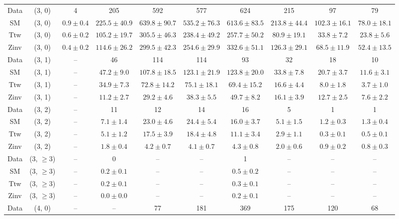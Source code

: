 \begin{table}[h!]
{\begin{tabular}{cccccccccc}
	Data & (3, 0) & 4 & 205 & 592 & 577 & 624 & 215 & 97 & 79 \\[0.5ex] 
	SM & (3, 0) & $0.9\pm 0.4$ & $225.5\pm 40.9$ & $639.8\pm 90.7$ & $535.2\pm 76.3$ & $613.6\pm 83.5$ & $213.8\pm 44.4$ & $102.3\pm 16.1$ & $78.0\pm 18.1$ \\[0.5ex] 
	Ttw & (3, 0) & $0.6\pm 0.2$ & $105.2\pm 19.7$ & $305.5\pm 46.3$ & $238.4\pm 49.2$ & $257.7\pm 50.2$ & $80.9\pm 19.1$ & $33.8\pm 7.2$ & $23.8\pm 5.6$ \\[0.5ex] 
	Zinv & (3, 0) & $0.4\pm 0.2$ & $114.6\pm 26.2$ & $299.5\pm 42.3$ & $254.6\pm 29.9$ & $332.6\pm 51.1$ & $126.3\pm 29.1$ & $68.5\pm 11.9$ & $52.4\pm 13.5$ \\[0.5ex] 
	Data & (3, 1) & -- & 46 & 114 & 114 & 93 & 32 & 18 & 10 \\[0.5ex] 
	SM & (3, 1) & -- & $47.2\pm 9.0$ & $107.8\pm 18.5$ & $123.1\pm 21.9$ & $123.8\pm 20.0$ & $33.8\pm 7.8$ & $20.7\pm 3.7$ & $11.6\pm 3.1$ \\[0.5ex] 
	Ttw & (3, 1) & -- & $34.9\pm 7.3$ & $72.8\pm 14.2$ & $75.1\pm 18.1$ & $69.4\pm 15.2$ & $16.6\pm 4.4$ & $8.0\pm 1.8$ & $3.7\pm 1.0$ \\[0.5ex] 
	Zinv & (3, 1) & -- & $11.2\pm 2.7$ & $29.2\pm 4.6$ & $38.3\pm 5.5$ & $49.7\pm 8.2$ & $16.1\pm 3.9$ & $12.7\pm 2.5$ & $7.6\pm 2.2$ \\[0.5ex] 
	Data & (3, 2) & -- & 11 & 12 & 14 & 16 & 5 & 1 & 1 \\[0.5ex] 
	SM & (3, 2) & -- & $7.1\pm 1.4$ & $23.0\pm 4.6$ & $24.4\pm 5.4$ & $16.0\pm 3.7$ & $5.1\pm 1.5$ & $1.2\pm 0.3$ & $1.3\pm 0.4$ \\[0.5ex] 
	Ttw & (3, 2) & -- & $5.1\pm 1.2$ & $17.5\pm 3.9$ & $18.4\pm 4.8$ & $11.1\pm 3.4$ & $2.9\pm 1.1$ & $0.3\pm 0.1$ & $0.5\pm 0.1$ \\[0.5ex] 
	Zinv & (3, 2) & -- & $1.8\pm 0.4$ & $4.2\pm 0.7$ & $4.1\pm 0.7$ & $4.3\pm 0.8$ & $2.0\pm 0.6$ & $0.9\pm 0.2$ & $0.8\pm 0.3$ \\[0.5ex] 
	Data & (3, $\ge3$) & -- & 0 & -- & -- & 1 & -- & -- & -- \\[0.5ex] 
	SM & (3, $\ge3$) & -- & $0.2\pm 0.1$ & -- & -- & $0.5\pm 0.2$ & -- & -- & -- \\[0.5ex] 
	Ttw & (3, $\ge3$) & -- & $0.2\pm 0.1$ & -- & -- & $0.3\pm 0.1$ & -- & -- & -- \\[0.5ex] 
	Zinv & (3, $\ge3$) & -- & $0.0\pm 0.0$ & -- & -- & $0.2\pm 0.1$ & -- & -- & -- \\[0.5ex] 
	Data & (4, 0) & -- & -- & 77 & 181 & 369 & 175 & 120 & 68 \\[0.5ex] 

\end{tabular}}
\end{table}
